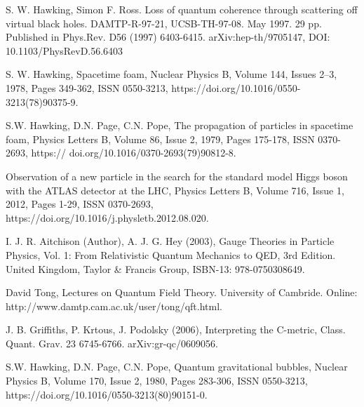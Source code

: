 \documentclass[%
 reprint,
 amsmath,amssymb,
 aps,
]{revtex4-1}
\begin{document}
\begin{thebibliography}{8}

 S. W. Hawking, Simon F. Ross. Loss of quantum coherence through scattering off virtual black holes. DAMTP-R-97-21, UCSB-TH-97-08. May 1997. 29 pp. Published in Phys.Rev. D56 (1997) 6403-6415. arXiv:hep-th/9705147, DOI: 10.1103/PhysRevD.56.6403 

 S. W. Hawking, Spacetime foam, Nuclear Physics B, Volume 144, Issues 2–3, 1978, Pages 349-362, ISSN 0550-3213, https://doi.org/10.1016/0550-3213(78)90375-9.

 S.W. Hawking, D.N. Page, C.N. Pope, The propagation of particles in spacetime foam, Physics Letters B, Volume 86, Issue 2, 1979, Pages 175-178, ISSN 0370-2693, https:// doi.org/10.1016/0370-2693(79)90812-8.

 Observation of a new particle in the search for the standard model Higgs boson with the ATLAS detector at the LHC, Physics Letters B, Volume 716, Issue 1, 2012, Pages 1-29, ISSN 0370-2693, https://doi.org/10.1016/j.physletb.2012.08.020.\

 I. J. R. Aitchison (Author), A. J. G. Hey (2003), Gauge Theories in Particle Physics, Vol. 1: From Relativistic Quantum Mechanics to QED, 3rd Edition. United Kingdom, Taylor \& Francis Group, ISBN-13: 978-0750308649.

 David Tong, Lectures on Quantum Field Theory. University of Cambride. Online: http://www.damtp.cam.ac.uk/user/tong/qft.html.

 J. B. Griffiths, P. Krtous, J. Podolsky (2006), Interpreting the C-metric, Class. Quant. Grav. 23 6745-6766. arXiv:gr-qc/0609056.

 S.W. Hawking, D.N. Page, C.N. Pope, Quantum gravitational bubbles, Nuclear Physics B, Volume 170, Issue 2, 1980, Pages 283-306, ISSN 0550-3213, https://doi.org/10.1016/0550-3213(80)90151-0.

\end{thebibliography}
\end{document}
